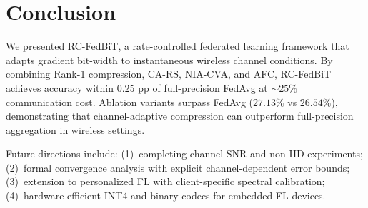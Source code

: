 \documentclass[conference]{IEEEtran}
\begin{document}
\section{Conclusion}

We presented RC-FedBiT, a rate-controlled federated learning framework that adapts gradient bit-width to instantaneous wireless channel conditions. By combining Rank-1 compression, CA-RS, NIA-CVA, and AFC, RC-FedBiT achieves accuracy within $0.25$ pp of full-precision FedAvg at $\sim\!25\%$ communication cost. Ablation variants surpass FedAvg ($27.13\%$ vs $26.54\%$), demonstrating that channel-adaptive compression can outperform full-precision aggregation in wireless settings.

Future directions include: (1)~completing channel SNR and non-IID experiments; (2)~formal convergence analysis with explicit channel-dependent error bounds; (3)~extension to personalized FL with client-specific spectral calibration; (4)~hardware-efficient INT4 and binary codecs for embedded FL devices.
\end{document}
